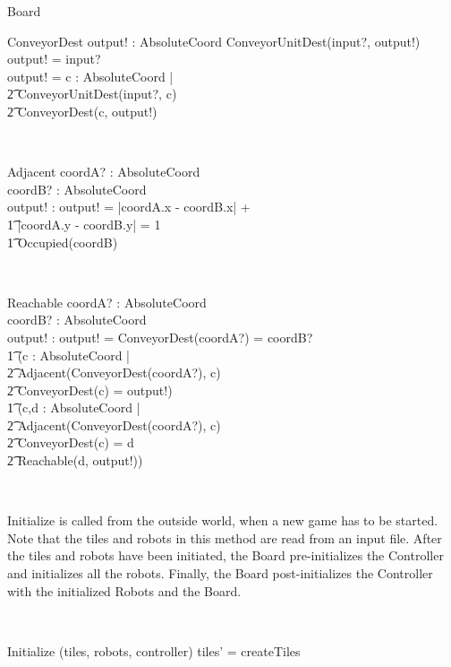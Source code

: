 \documentclass[12pt]{article}
\begin{document}
\begin{class}{Board}
\begin{schema}{ConveyorDest}
output! : AbsoluteCoord
\where
\IF ConveyorUnitDest(input?, output!) \\
\THEN output! = input? \\
\ELSE output! = \exists c : AbsoluteCoord | \\ \t2 ConveyorUnitDest(input?, c) \\ \t2 ConveyorDest(c, output!)
\end{schema} \\
\begin{schema}{Adjacent}
coordA? : AbsoluteCoord \\
coordB? : AbsoluteCoord \\
output! : \bool
\where
output! = |\!coordA.x - coordB.x\!| + \\ \t1 |\!coordA.y - coordB.y\!| = 1 \\ \t1
\neg Occupied(coordB)
\end{schema} \\
\begin{schema}{Reachable}
coordA? : AbsoluteCoord \\
coordB? : AbsoluteCoord \\
output! : \bool
\where
output! = ConveyorDest(coordA?) = coordB? \: \vee \\ \t1 (\exists c : AbsoluteCoord | \\ \t2 Adjacent(ConveyorDest(coordA?), c) \: \wedge \\ \t2 ConveyorDest(c) = output!) \: \vee \\ \t1
(\exists c,d : AbsoluteCoord | \\ \t2 Adjacent(ConveyorDest(coordA?), c) \: \wedge \\ \t2 ConveyorDest(c) = d \: \wedge \\ \t2 Reachable(d, output!))
\end{schema} \\
\znewpage
\begin{classcom}
Initialize is called from the outside world, when a new game has to be started. Note that the tiles and robots in this method are read from an input file. After the tiles and robots have been initiated, the Board pre-initializes the Controller and initializes all the robots. Finally, the Board post-initializes the Controller with the initialized Robots and the Board.
\end{classcom} \\
\begin{schema}{Initialize}
\Delta (tiles, robots, controller)
\where
tiles' = createTiles \\

\end{schema}
\end{class}
\end{document}

